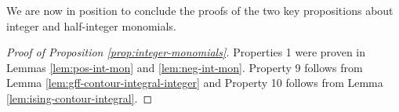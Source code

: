 \documentclass[12pt,oneside,english]{amsart}
\numberwithin{equation}{section}
\numberwithin{figure}{section}
\theoremstyle{plain}
\theoremstyle{plain}
\theoremstyle{plain}
\theoremstyle{plain}
\theoremstyle{remark}
\theoremstyle{definition}
\theoremstyle{plain}
\theoremstyle{plain}
\newtheorem*{prop*}{\protect\propositionname}
\numberwithin{thm}{section}
\providecommand{\propositionname}{Proposition}
\providecommand{\propositionname}{Proposition}
\providecommand{\propositionname}{Proposition}
\providecommand{\propositionname}{Proposition}
\begin{document}
We are now in position to conclude the proofs of the two key propositions
about integer and half-integer monomials. 
\begin{proof}[Proof of Proposition \ref{prop:integer-monomials}]
Properties 1 were proven in Lemmas \ref{lem:pos-int-mon}
and \ref{lem:neg-int-mon}. Property 9 follows from Lemma 
\ref{lem:gff-contour-integral-integer}
and Property 10 follows from Lemma \ref{lem:ising-contour-integral}.
\end{proof}
\end{document}
